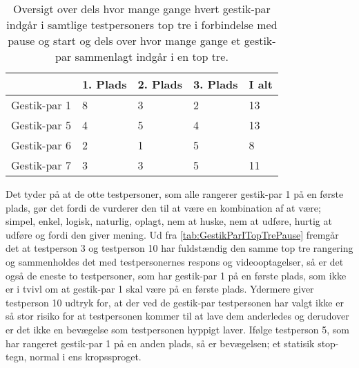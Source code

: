 %
\begin{table}[H]
	\centering
	\begin{tabular}{ | p{2.4cm} | p{2.4cm} | p{2.4cm} | p{2.4cm} |p{2.4cm}|}
	\hline
		 & 1. Plads & 2. Plads & 3. Plads & I alt \\ \hline
		Gestik-par 1 & 8 & 3 & 2 & 13\\ \hline
		Gestik-par 5 & 4 & 5 & 4 & 13\\ \hline
		Gestik-par 6 & 2 & 1 & 5 & 8\\ \hline 
		Gestik-par 7 & 3 & 3 & 5 & 11\\ \hline
	\end{tabular}
	\caption{Oversigt over dels hvor mange gange hvert gestik-par indgår i samtlige testpersoners top tre i forbindelse med pause og start og dels over hvor mange gange et gestik-par sammenlagt indgår i en top tre.}
	\label{tab:GestikParITopTrePauseOversigt}
\end{table}
\noindent
%
Det tyder på at de otte testpersoner, som alle rangerer gestik-par 1 på en første plads, gør det fordi de vurderer den til at være en kombination af at være; simpel, enkel, logisk, naturlig, oplagt, nem at huske, nem at udføre, hurtig at udføre og fordi den giver mening. Ud fra \autoref{tab:GestikParITopTrePause} fremgår det at testperson 3 og testperson 10 har fuldstændig den samme top tre rangering og sammenholdes det med testpersonernes respons og videooptagelser, så er det også de eneste to testpersoner, som har gestik-par 1 på en første plads, som ikke er i tvivl om at gestik-par 1 skal være på en første plads. Ydermere giver testperson 10 udtryk for, at der ved de gestik-par testpersonen har valgt ikke er så stor risiko for at testpersonen kommer til at lave dem anderledes og derudover er det ikke en bevægelse som testpersonen hyppigt laver. Ifølge testperson 5, som har rangeret gestik-par 1 på en anden plads, så er bevægelsen; et statisik stop-tegn, normal i ens kropssproget.   

